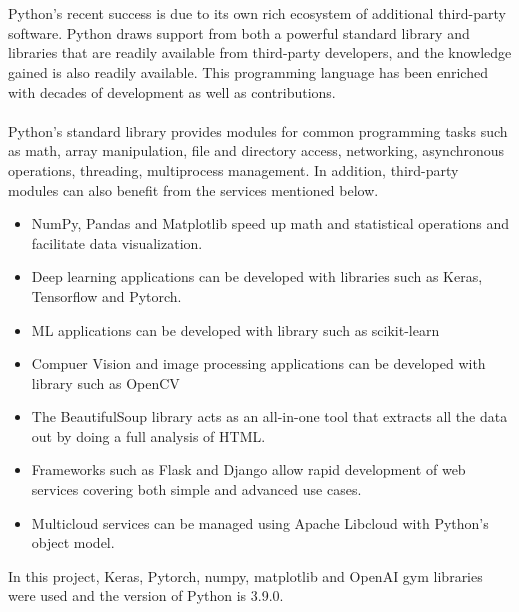 \documentclass[12pt,twoside,a4]{mwbk}
\begin{document}
\\ \\
Python's recent success is due to its own rich ecosystem of additional third-party software. Python draws support from both a powerful standard library and libraries that are readily available from third-party developers, and the knowledge gained is also readily available. This programming language has been enriched with decades of development as well as contributions.
\\ \\
Python's standard library provides modules for common programming tasks such as math, array manipulation, file and directory access, networking, asynchronous operations, threading, multiprocess management. In addition, third-party modules can also benefit from the services mentioned below.

\begin{itemize}
    \item NumPy, Pandas and Matplotlib speed up math and statistical operations and facilitate data visualization.
    \item Deep learning applications can be developed with libraries such as Keras, Tensorflow and Pytorch.
    \item ML applications can be developed with library such as scikit-learn
    \item Compuer Vision and image processing applications can be developed with library such as OpenCV
    \item The BeautifulSoup library acts as an all-in-one tool that extracts all the data out by doing a full analysis of HTML.
    \item Frameworks such as Flask and Django allow rapid development of web services covering both simple and advanced use cases.
    \item Multicloud services can be managed using Apache Libcloud with Python's object model.
\end{itemize}
In this project, Keras, Pytorch, numpy, matplotlib and OpenAI gym libraries were used and the version of Python is 3.9.0.
\end{document}

